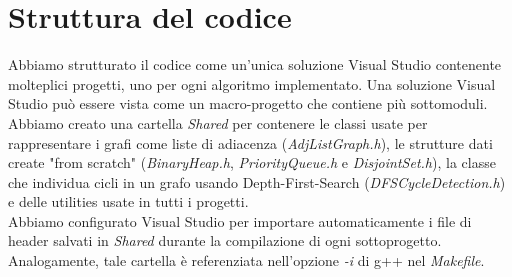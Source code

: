 \section{Struttura del codice}
\label{cap:code-structure}

Abbiamo strutturato il codice come un'unica soluzione Visual Studio contenente molteplici progetti, uno per ogni algoritmo implementato.
Una soluzione Visual Studio può essere vista come un macro-progetto che contiene più sottomoduli. \\

\noindent Abbiamo creato una cartella \textit{Shared} per contenere le classi usate per rappresentare i grafi come liste di adiacenza (\textit{AdjListGraph.h}), le strutture dati create "from scratch" (\textit{BinaryHeap.h}, \textit{PriorityQueue.h} e \textit{DisjointSet.h}), la classe che individua cicli in un grafo usando Depth-First-Search (\textit{DFSCycleDetection.h}) e
delle utilities usate in tutti i progetti. \\

\noindent Abbiamo configurato Visual Studio per importare automaticamente i file di header salvati in \textit{Shared}
durante la compilazione di ogni sottoprogetto. Analogamente, tale cartella è referenziata nell'opzione \textit{-i} di g++ nel \textit{Makefile}.
